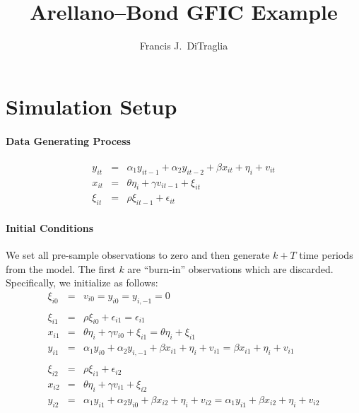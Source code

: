\documentclass[12pt]{article}
\title{Arellano--Bond GFIC Example}
\author{Francis J.\ DiTraglia}
\begin{document}
\maketitle

\section{Simulation Setup}

\paragraph{Data Generating Process} 
\begin{eqnarray*}
y_{it} &=& \alpha_1 y_{it-1} + \alpha_2 y_{it-2} +\beta   x_{it} + \eta_i + v_{it}\\
x_{it} &=& \theta \eta_i + \gamma v_{it-1} + \xi_{it}\\
\xi_{it} &=& \rho \xi_{it-1} + \epsilon_{it}
\end{eqnarray*}

\paragraph{Initial Conditions} We set all pre-sample observations to zero and then generate $k + T$ time periods from the model. The first $k$ are ``burn-in'' observations which are discarded. Specifically, we initialize as follows:
  \begin{eqnarray*}
    \xi_{i0} &=& v_{i0} = y_{i0} = y_{i,-1} = 0\\ \\
    \xi_{i1} &=& \rho \xi_{i0} + \epsilon_{i1} = \epsilon_{i1}\\
    x_{i1} &=& \theta \eta_i + \gamma v_{i0} + \xi_{i1} = \theta \eta_i + \xi_{i1} \\
    y_{i1} &=& \alpha_1 y_{i0} + \alpha_2 y_{i,-1} + \beta x_{i1} + \eta_i + v_{i1} = \beta x_{i1} + \eta_i + v_{i1}  \\ \\
    \xi_{i2} &=& \rho \xi_{i1} + \epsilon_{i2} \\
    x_{i2} &=& \theta \eta_i + \gamma v_{i1} + \xi_{i2}\\
    y_{i2} &=& \alpha_1 y_{i1} + \alpha_2 y_{i0} + \beta x_{i2} + \eta_i + v_{i2} = \alpha_1 y_{i1} + \beta x_{i2} + \eta_i + v_{i2} 
  \end{eqnarray*}
\end{document}
